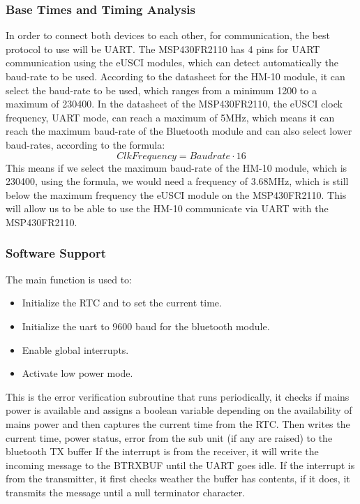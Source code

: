\subsubsection{Base Times and Timing Analysis}
In order to connect both devices to each other, for communication, the best protocol to use will be UART. The MSP430FR2110 has 4 pins for UART communication using the eUSCI modules, which can detect automatically the baud-rate to be used. According to the datasheet for the HM-10 module\cite{AmazonComHiLetgo}, it can select the baud-rate to be used, which ranges from a minimum 1200 to a maximum of 230400. In the datasheet of the MSP430FR2110, the eUSCI clock frequency, UART mode, can reach a maximum of 5MHz, which means it can reach the maximum baud-rate of the Bluetooth module and can also select lower baud-rates, according to the formula:
\begin{equation}
	Clk Frequency = Baudrate \cdot 16
	\label{eq:UART Frequency}
\end{equation}
This means if we select the maximum baud-rate of the HM-10 module, which is 230400, using the formula, we would need a frequency of 3.68MHz, which is still below the maximum frequency the eUSCI module on the MSP430FR2110. This will allow us to be able to use the HM-10 communicate via UART with the MSP430FR2110.\\
\subsubsection{Software Support}
The main function is used to:
  \begin{itemize}
    \item Initialize the RTC and to set the current time.
    \item Initialize the uart to 9600 baud for the bluetooth module.
    \item Enable global interrupts.
    \item Activate low power mode.
  \end{itemize}
This is the error verification subroutine that runs periodically, it checks if mains power is available and assigns a boolean variable depending on the availability of mains power and then captures the current time from the RTC. Then writes the current time, power status, error from the sub unit (if any are raised) to the bluetooth TX buffer
If the interrupt is from the receiver, it will write the incoming message to the BTRXBUF until the UART goes idle. If the interrupt is from the transmitter, it first checks weather the buffer has contents, if it does, it transmits the message until a null terminator character.
